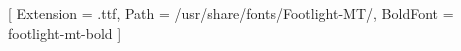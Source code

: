 [
	Extension = .ttf,
	Path = /usr/share/fonts/Footlight-MT/,
	BoldFont = footlight-mt-bold
]


%
%
%
%


